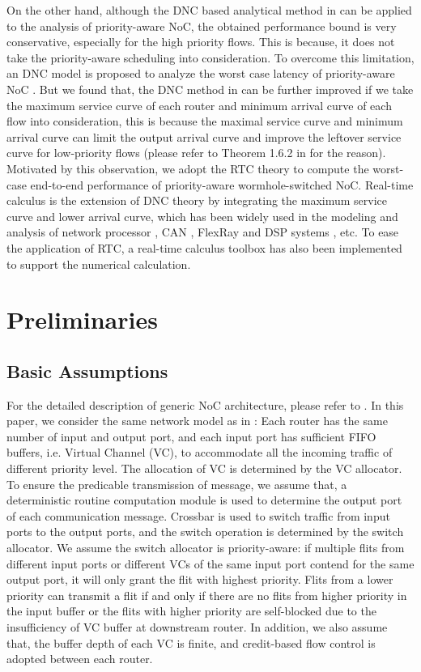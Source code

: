 \documentclass[10pt,journal]{IEEEtran}
\begin{document}
On the other hand, although the DNC based analytical method in  \cite{qian2009analysis} can be applied to the analysis of priority-aware NoC, the obtained performance bound is very conservative, especially for the high priority flows. This is because, it does not take the priority-aware scheduling into consideration. To overcome this limitation, an DNC model is proposed to analyze the worst case latency of priority-aware NoC \cite{Qian489900}. But we found that, the DNC method in \cite{Qian489900} can be further improved if we take the maximum service curve of each router and minimum arrival curve of each flow into consideration, this is because the maximal service curve and minimum arrival curve can limit the output arrival curve and improve the leftover service curve for low-priority flows (please refer to Theorem 1.6.2 in \cite{Boudec2001Network} for the reason). Motivated by this observation, we adopt the RTC theory \cite{1253607} to compute the worst-case end-to-end performance of priority-aware wormhole-switched NoC. Real-time calculus is the extension of DNC theory by integrating the maximum service curve and lower arrival curve, which has been widely used in the modeling and analysis of network processor \cite{1253838}, CAN \cite{4617308}, FlexRay \cite{Hagiescu:2007:PAF:1278480.1278554} and DSP systems \cite{thiele2005performance}, etc. To ease the application of RTC, a real-time calculus toolbox \cite{rtc} has also been implemented to support the numerical calculation.

\section{Preliminaries}\label{model}
\subsection{Basic Assumptions}
For the detailed description of generic NoC architecture, please refer to \cite{jerger2009chip}. In this paper, we consider the same network model as in \cite{627905}\cite{Shi:2008:RCA:1397757.1397996}\cite{707545}\cite{73}: Each router has the same number of input and output port, and each input port has sufficient FIFO buffers, i.e. Virtual Channel (VC), to accommodate all the incoming traffic of different priority level. The allocation of VC is determined by the VC allocator. To ensure the predicable transmission of message, we assume that, a deterministic routine computation module is used to determine the output port of each communication message. Crossbar is used to switch traffic from input ports to the output ports, and the switch operation is determined by the switch allocator. We assume the switch allocator is priority-aware: if multiple flits from different input ports or different VCs of the same input port contend for the same output port, it will only grant the flit with highest priority. Flits from a lower priority can transmit a flit if and only if there are no flits from higher priority in the input buffer or the flits with higher priority are self-blocked due to the insufficiency of VC buffer at downstream router. In addition, we also assume that, the buffer depth of each VC is finite, and credit-based flow control is adopted between each router.
\end{document}
